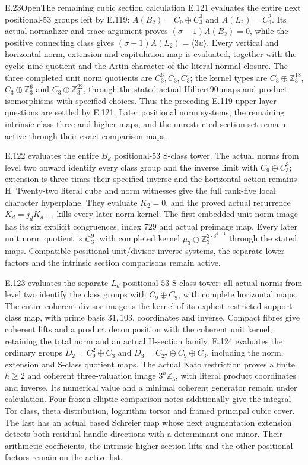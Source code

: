 \begin{statement}{E.23}{Open}{The remaining cubic section calculation}
E.121 evaluates the entire next positional-$53$ groups left
by E.119: $A(B_2)=C_9\oplus C_3^3$ and $A(L_2)=C_9^2$.
Its actual normalizer and trace argument proves
$(\sigma-1)A(B_2)=0$, while the positive connecting class
gives $(\sigma-1)A(L_2)=\langle3u\rangle$.
Every vertical and horizontal norm, extension and capitulation
map is evaluated, together with the cyclic-nine quotient and
the Artin character of the literal normal closure.
The three completed unit norm quotients are $C_3^6,C_3,C_3$;
the kernel types are $C_3\oplus\mathbb Z_3^{18}$,
$C_3\oplus\mathbb Z_3^6$ and
$C_3\oplus\mathbb Z_3^{22}$, through the stated actual
Hilbert90 maps and product isomorphisms with specified choices.
Thus the preceding E.119 upper-layer questions are settled
by E.121. Later positional norm systems, the remaining
intrinsic class-three and higher maps, and the unrestricted
section set remain active through their exact comparison maps.

E.122 evaluates the entire $B_d$ positional-$53$ S-class tower.
The actual norms from level two onward identify every class group
and the inverse limit with $C_9\oplus C_3^3$; extension is three
times their specified inverse and the horizontal action remains H.
Twenty-two literal cube and norm witnesses give the full rank-five
local character hyperplane. They evaluate $K_2=0$, and the proved
actual recurrence $K_d=j_dK_{d-1}$ kills every later norm kernel.
The first embedded unit norm image has its six explicit congruences,
index $729$ and actual preimage map. Every later unit norm quotient
is $C_3^9$, with completed kernel
$\mu_3\oplus\mathbb Z_3^{2\cdot3^{d+1}}$ through the stated maps.
Compatible positional unit/divisor inverse systems, the separate
lower factors and the intrinsic section comparisons remain active.

E.123 evaluates the separate $L_d$ positional-$53$ S-class tower:
all actual norms from level two identify the class groups with
$C_9\oplus C_9$, with complete horizontal maps. The entire coherent
divisor image is the kernel of its explicit restricted-support class
map, with prime basis $31,103$, coordinates and inverse. Compact fibres
give coherent lifts and a product decomposition with the coherent
unit kernel, retaining the total norm and an actual H-section family.
E.124 evaluates the ordinary groups
$D_2=C_9^2\oplus C_3$ and $D_3=C_{27}\oplus C_9\oplus C_3$,
including the norm, extension and S-class quotient maps. The actual
Kato restriction proves a finite $h\geq2$ and coherent three-valuation
image $3^h\mathbb Z_3$, with literal product coordinates and inverse.
Its numerical value and a minimal coherent generator remain under
calculation. Four frozen elliptic comparison notes additionally give
the integral Tor class, theta distribution, logarithm torsor and
framed principal cubic cover. The last has an actual based Schreier
map whose next augmentation extension detects both residual handle
directions with a determinant-one minor. Their arithmetic coefficients,
the intrinsic higher section lifts and the other positional factors
remain on the active list.
\end{statement}
